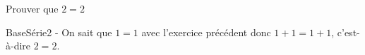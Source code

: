 \begin{exercice*}
    Prouver que $2=2$
\end{exercice*}
\begin{corrige}
    BaseSérie2 - On sait que $1=1$ avec l’exercice précédent donc $1+1=1+1$,
    c’est-à-dire $2=2$.
\end{corrige}